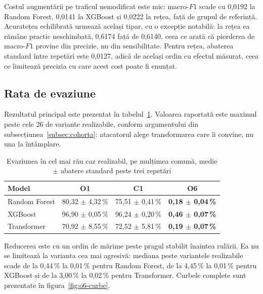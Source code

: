 Costul augmentării pe traficul nemodificat este mic: macro-$F1$ scade cu 0,0192 la Random Forest, 0,0141 la XGBoost și 0,0222 la rețea, față de grupul de referință. Acuratețea echilibrată urmează același tipar, cu o excepție notabilă: la rețea ea rămâne practic neschimbată, 0,6174 față de 0,6140, ceea ce arată că pierderea de macro-$F1$ provine din precizie, nu din sensibilitate. Pentru rețea, abaterea standard între repetări este 0,0127, adică de același ordin cu efectul măsurat, ceea ce limitează precizia cu care acest cost poate fi enunțat.

\subsection{Rata de evaziune}\label{subsec:o6-evaziune}

Rezultatul principal este prezentat în tabelul~\ref{tab:o6-evaziune}. Valoarea raportată este maximul peste cele 26 de variante realizabile, conform argumentului din subsecțiunea~\ref{subsec:cohorta}: atacatorul alege transformarea care îi convine, nu una la întâmplare.

\begin{table}[!ht]
    \caption{Evaziunea în cel mai rău caz realizabil, pe mulțimea comună, medie $\pm$ abatere standard peste trei repetări}
    \centering
    \begin{tabular}{|l|c|c|c|}
        \hline
        \textbf{Model} & \textbf{O1} & \textbf{C1} & \textbf{O6} \\
        \hline
        Random Forest       & 80,32 $\pm$ 4,32\,\% & 75,51 $\pm$ 0,41\,\% & \textbf{0,18 $\pm$ 0,04\,\%} \\
        \hline
        XGBoost & 96,90 $\pm$ 0,05\,\% & 96,24 $\pm$ 0,20\,\% & \textbf{0,46 $\pm$ 0,07\,\%} \\
        \hline
        Transformer       & 70,92 $\pm$ 8,55\,\% & 72,52 $\pm$ 5,81\,\% & \textbf{0,19 $\pm$ 0,07\,\%} \\
        \hline
    \end{tabular}
    \label{tab:o6-evaziune}
\end{table}

Reducerea este cu un ordin de mărime peste pragul stabilit înaintea rulării. Ea nu se limitează la varianta cea mai agresivă: mediana peste variantele realizabile scade de la 0,44\,\% la 0,01\,\% pentru Random Forest, de la 4,45\,\% la 0,01\,\% pentru XGBoost și de la 3,00\,\% la 0,02\,\% pentru Transformer. Curbele complete sunt prezentate în figura~\ref{fig:o6-curbe}.

